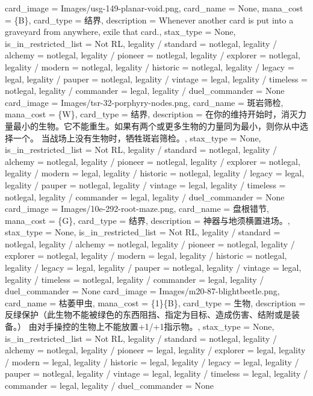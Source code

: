 \documentclass[lang = cn, color = black, 10pt]{AllThatStax}
\begin{document}
\card
{
	card_image = Images/usg-149-planar-void.png,
	card_name = None,
	mana_cost = \{B\},
	card_type = 结界,
	description = Whenever another card is put into a graveyard from anywhere, exile that card.,
	stax_type = None,
	is_in_restricted_list = Not RL,
	legality / standard = notlegal,
	legality / alchemy = notlegal,
	legality / pioneer = notlegal,
	legality / explorer = notlegal,
	legality / modern = notlegal,
	legality / historic = notlegal,
	legality / legacy = legal,
	legality / pauper = notlegal,
	legality / vintage = legal,
	legality / timeless = notlegal,
	legality / commander = legal,
	legality / duel_commander = None
}
\card
{
	card_image = Images/tsr-32-porphyry-nodes.png,
	card_name = 斑岩筛检,
	mana_cost = \{W\},
	card_type = 结界,
	description = 在你的维持开始时，消灭力量最小的生物。它不能重生。如果有两个或更多生物的力量同为最小，则你从中选择一个。
	当战场上没有生物时，牺牲斑岩筛检。,
	stax_type = None,
	is_in_restricted_list = Not RL,
	legality / standard = notlegal,
	legality / alchemy = notlegal,
	legality / pioneer = notlegal,
	legality / explorer = notlegal,
	legality / modern = legal,
	legality / historic = notlegal,
	legality / legacy = legal,
	legality / pauper = notlegal,
	legality / vintage = legal,
	legality / timeless = notlegal,
	legality / commander = legal,
	legality / duel_commander = None
}
\card
{
	card_image = Images/10e-292-root-maze.png,
	card_name = 盘根错节,
	mana_cost = \{G\},
	card_type = 结界,
	description = 神器与地须横置进场。,
	stax_type = None,
	is_in_restricted_list = Not RL,
	legality / standard = notlegal,
	legality / alchemy = notlegal,
	legality / pioneer = notlegal,
	legality / explorer = notlegal,
	legality / modern = legal,
	legality / historic = notlegal,
	legality / legacy = legal,
	legality / pauper = notlegal,
	legality / vintage = legal,
	legality / timeless = notlegal,
	legality / commander = legal,
	legality / duel_commander = None
}
\card
{
	card_image = Images/m20-87-blightbeetle.png,
	card_name = 枯萎甲虫,
	mana_cost = \{1\}\{B\},
	card_type = 生物,
	description = 反绿保护（此生物不能被绿色的东西阻挡、指定为目标、造成伤害、结附或是装备。）
	由对手操控的生物上不能放置+1/+1指示物。,
	stax_type = None,
	is_in_restricted_list = Not RL,
	legality / standard = notlegal,
	legality / alchemy = notlegal,
	legality / pioneer = legal,
	legality / explorer = legal,
	legality / modern = legal,
	legality / historic = legal,
	legality / legacy = legal,
	legality / pauper = notlegal,
	legality / vintage = legal,
	legality / timeless = legal,
	legality / commander = legal,
	legality / duel_commander = None
}
\end{document}
